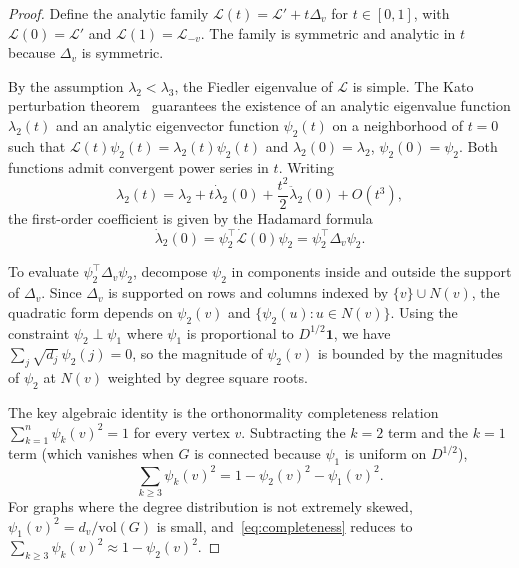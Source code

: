 \documentclass[12pt, a4paper]{article}
\begin{document}
\begin{proof}
Define the analytic family $\mathcal{L}(t) = \mathcal{L}' + t \Delta_v$ for $t \in [0, 1]$, with $\mathcal{L}(0) = \mathcal{L}'$ and $\mathcal{L}(1) = \mathcal{L}_{-v}$. The family is symmetric and analytic in $t$ because $\Delta_v$ is symmetric.

By the assumption $\lambda_2 < \lambda_3$, the Fiedler eigenvalue of $\mathcal{L}$ is simple. The Kato perturbation theorem~\citep[Chapter II, \S 1]{kato1995perturbation} guarantees the existence of an analytic eigenvalue function $\lambda_2(t)$ and an analytic eigenvector function $\psi_2(t)$ on a neighborhood of $t = 0$ such that $\mathcal{L}(t) \psi_2(t) = \lambda_2(t) \psi_2(t)$ and $\lambda_2(0) = \lambda_2$, $\psi_2(0) = \psi_2$. Both functions admit convergent power series in $t$. Writing
\begin{equation}
\lambda_2(t) = \lambda_2 + t \dot\lambda_2(0) + \frac{t^2}{2} \ddot\lambda_2(0) + O(t^3),
\end{equation}
the first-order coefficient is given by the Hadamard formula~\citep{magnus1985differentiating}
\begin{equation}\label{eq:hadamard}
\dot\lambda_2(0) = \psi_2^\top \dot{\mathcal{L}}(0) \psi_2 = \psi_2^\top \Delta_v \psi_2.
\end{equation}

To evaluate $\psi_2^\top \Delta_v \psi_2$, decompose $\psi_2$ in components inside and outside the support of $\Delta_v$. Since $\Delta_v$ is supported on rows and columns indexed by $\{v\} \cup N(v)$, the quadratic form depends on $\psi_2(v)$ and $\{\psi_2(u) : u \in N(v)\}$. Using the constraint $\psi_2 \perp \psi_1$ where $\psi_1$ is proportional to $D^{1/2} \mathbf{1}$, we have $\sum_j \sqrt{d_j}\, \psi_2(j) = 0$, so the magnitude of $\psi_2(v)$ is bounded by the magnitudes of $\psi_2$ at $N(v)$ weighted by degree square roots.

The key algebraic identity is the orthonormality completeness relation $\sum_{k=1}^n \psi_k(v)^2 = 1$ for every vertex $v$. Subtracting the $k = 2$ term and the $k = 1$ term (which vanishes when $G$ is connected because $\psi_1$ is uniform on $D^{1/2}$),
\begin{equation}\label{eq:completeness}
\sum_{k \geq 3} \psi_k(v)^2 = 1 - \psi_2(v)^2 - \psi_1(v)^2.
\end{equation}
For graphs where the degree distribution is not extremely skewed, $\psi_1(v)^2 = d_v / \mathrm{vol}(G)$ is small, and~\eqref{eq:completeness} reduces to $\sum_{k \geq 3} \psi_k(v)^2 \approx 1 - \psi_2(v)^2$.


\end{proof}
\end{document}

